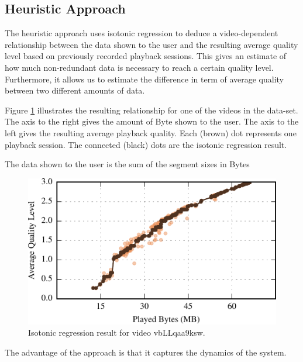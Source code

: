 
\subsection{Heuristic Approach}

The heuristic approach uses isotonic regression to deduce a video-dependent relationship between the data shown to the user and the resulting average quality level based on previously recorded playback sessions.
This gives an estimate of how much non-redundant data is necessary to reach a certain quality level.
Furthermore, it allows us to estimate the difference in term of average quality between two different amounts of data.

Figure \ref{fig:heuristic} illustrates the resulting relationship for one of the videos in the data-set.
The axis to the right gives the amount of Byte shown to the user.
The axis to the left gives the resulting average playback quality.
Each (brown) dot represents one playback session.
The connected (black) dots are the isotonic regression result.

The data shown to the user is the sum of the segment sizes in Bytes 

\begin{figure}[t]
\centering
\includegraphics[width=0.9\linewidth]{figs/32_vbLLqaa9ksw.pdf}%
\caption{Isotonic regression result for video vbLLqaa9ksw.}
\label{fig:heuristic}%
\end{figure}

The advantage of the approach is that it captures the dynamics of the system.
